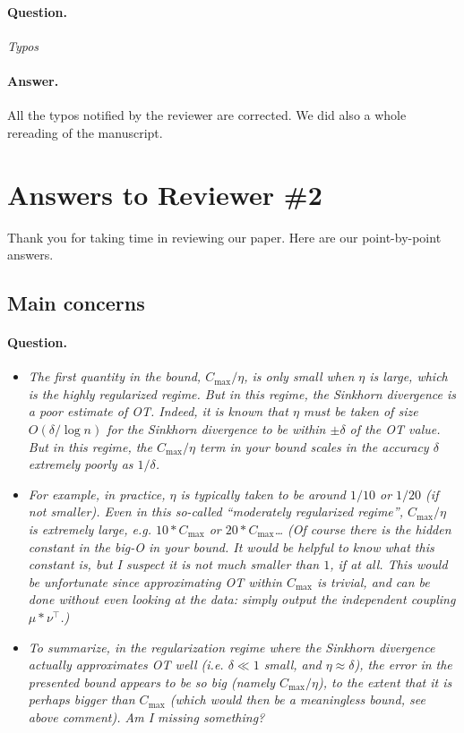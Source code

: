 \documentclass[11pt]{article}
\begin{document}
\paragraph{Question.}

\emph{Typos}

\paragraph{Answer.} 

All the typos notified by the reviewer are corrected. We did also a whole rereading of the manuscript.

\section{Answers to Reviewer \#2} 

Thank you for taking time in reviewing our paper. Here are our point-by-point answers.

\subsection{Main concerns}

\paragraph{Question.}
\begin{itemize}

	\item \emph{The first quantity in the bound, $C_{\max}/\eta$, is only small when $\eta$ is large, which is the highly regularized regime. But in this regime, the Sinkhorn divergence is a poor estimate of OT. Indeed, it is known that $\eta$ must be taken of size $O(\delta/\log n)$ for the Sinkhorn divergence to be within $\pm \delta$ of the OT value. But in this regime, the $C_{\max}/\eta$ term in your bound scales in the accuracy $\delta$ extremely poorly as $1/\delta$. }

	\item \emph{For example, in practice, $\eta$ is typically taken to be around $1/10$ or $1/20$ (if not smaller). Even in this so-called “moderately regularized regime”, $C_{\max}/\eta$ is extremely large, e.g. $10*C_{\max}$ or $20*C_{\max}$… (Of course there is the hidden constant in the big-O in your bound. It would be helpful to know what this constant is, but I suspect it is not much smaller than $1$, if at all. This would be unfortunate since approximating OT within $C_{\max}$ is trivial, and can be done without even looking at the data: simply output the independent coupling $\mu*\nu^\top$.)}

	\item \emph{To summarize, in the regularization regime where the Sinkhorn divergence actually approximates OT well (i.e. $\delta \ll 1$ small, and $\eta\approx\delta$), the error in the presented bound appears to be so big (namely $C_{\max}/\eta$), to the extent that it is perhaps bigger than $C_{\max}$ (which would then be a meaningless bound, see above comment). Am I missing something?}
\end{itemize}
\end{document}
